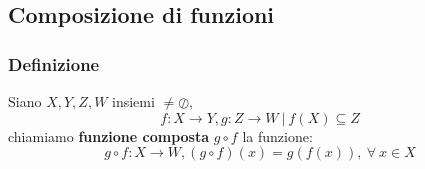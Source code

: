 \subsection{Composizione di funzioni}
\subsubsection*{Definizione}
Siano $X,Y,Z,W$ insiemi $\neq \oslash$,
\[f:X \rightarrow Y, g:Z\rightarrow W\ |\ f(X) \subseteq Z\]
chiamiamo \textbf{funzione composta} $g \circ f$ la funzione:
\[
    g \circ f: X \rightarrow W, (g \circ f)(x) = g(f(x)),\ \forall\ x \in X 
\]